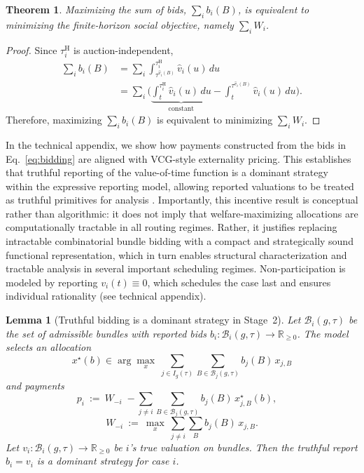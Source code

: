 \documentclass[letterpaper]{article}
\newtheorem{theorem}{Theorem}
\newtheorem{lemma}{Lemma}
\newif\ifconf
\begin{document}
\begin{theorem}
Maximizing the sum of bids, $\sum_i b_i(B)$, is equivalent to minimizing 
the finite-horizon social objective, namely $\sum_i W_i$.
\end{theorem}
\begin{proof}
Since $\tau_i^{\mathrm{H}}$ is auction-independent,
\begin{equation}
\begin{aligned}
\sum_i b_i(B)
&= \sum_i\int_{\tau^{\hat v_i(B)}}^{\tau_i^{\mathrm{H}}} \hat v_i(u)\,du \\[0.8em]
&= \sum_i\Big(
   \underbrace{\int_{t}^{\tau_i^{\mathrm{H}}} \hat v_i(u)\,du}_{\text{constant}}
   - \int_{t}^{\tau^{\hat v_i(B)}}\hat  v_i(u)\,du
   \Big).
\end{aligned}
\end{equation}
Therefore, maximizing $\sum_i b_i(B)$ is equivalent to minimizing $\sum_i W_i$.
\end{proof}


\ifconf
In the technical appendix, we show how payments constructed from the bids
in Eq.~\eqref{eq:bidding} are aligned with VCG-style externality pricing.
This establishes that truthful reporting of the value-of-time function is a
dominant strategy within the expressive reporting model, allowing reported
valuations to be treated as truthful primitives for analysis
\citep{groves1973,clarke1971,vickrey1961}.
Importantly, this incentive result is conceptual rather than algorithmic:
it does not imply that welfare-maximizing allocations are computationally
tractable in all routing regimes.
Rather, it justifies replacing intractable combinatorial bundle bidding with
a compact and strategically sound functional representation, which in turn
enables structural characterization and tractable analysis in several
important scheduling regimes.
Non-participation is modeled by reporting $v_i(t)\equiv 0$, which schedules
the case last and ensures individual rationality (see technical appendix).


\else
\begin{lemma}[Truthful bidding is a dominant strategy in Stage~2]\label{lem:truthful}
Let $\mathcal{B}_i(g,\tau)$ be the set of admissible bundles with reported bids
$b_i:\mathcal{B}_i(g,\tau)\to\mathbb{R}_{\ge0}$. The model selects an allocation
\[
x^\star(b)\in\arg\max_{x}\ \sum_{j\in I_g(\tau)}\sum_{B\in\mathcal{B}_j(g,\tau)} b_j(B)\,x_{j,B}
\]
and payments
\[
p_i\ :=\ W_{-i}\;-\!\!\sum_{j\neq i}\sum_{B\in\mathcal{B}_j(g,\tau)} b_j(B)\,x^\star_{j,B}(b),
\quad
\]
\[
W_{-i}\ :=\ \max_{x}\ \sum_{j\neq i}\sum_{B} b_j(B)\,x_{j,B}.
\]
Let $v_i:\mathcal{B}_i(g,\tau)\to\mathbb{R}_{\ge0}$ be $i$'s true valuation on bundles.
Then the truthful report $b_i=v_i$ is a dominant strategy for case $i$.
\end{lemma}
\end{document}
